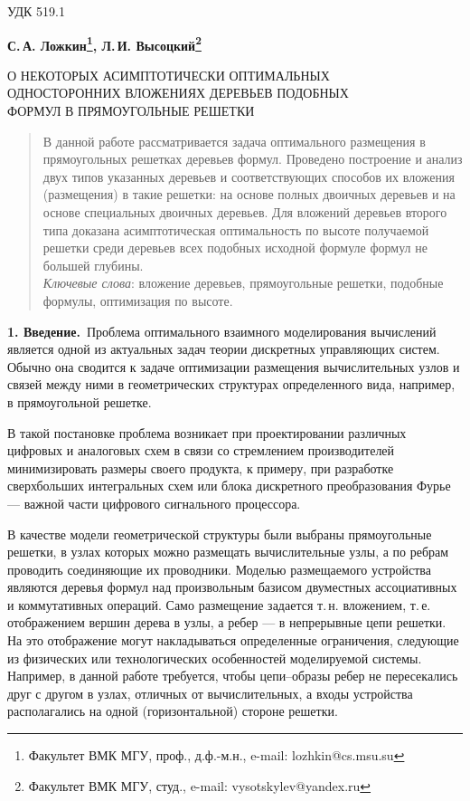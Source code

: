 \documentclass[12pt, a4paper]{article}
\theoremstyle{plain}
\theoremstyle{definition}
\theoremstyle{definition}
\begin{document}
\noindent УДК 519.1
\medskip

{\bfseries
С.\,А. Ложкин\footnote[1]{Факультет ВМК МГУ, проф., д.ф.-м.н.,
                       e-mail: lozhkin@cs.msu.su},
Л.\,И. Высоцкий\footnote[2]{Факультет ВМК МГУ, студ.,
                       e-mail: vysotskylev@yandex.ru}
\medskip

О НЕКОТОРЫХ АСИМПТОТИЧЕСКИ ОПТИМАЛЬНЫХ \\
\indent ОДНОСТОРОННИХ ВЛОЖЕНИЯХ  ДЕРЕВЬЕВ ПОДОБНЫХ \\
\indent ФОРМУЛ  В ПРЯМОУГОЛЬНЫЕ РЕШЕТКИ
}

\begin{quotation}{\footnotesize
В данной работе рассматривается задача оптимального размещения в прямоугольных 
решетках деревьев формул. Проведено построение 
и анализ двух типов указанных деревьев и соответствующих способов их вложения (размещения) в 
такие решетки: 
на основе полных двоичных деревьев и на основе специальных двоичных деревьев.
Для вложений деревьев второго типа доказана асимптотическая оптимальность по высоте получаемой решетки 
среди деревьев всех подобных исходной формуле формул не большей глубины.
  \\
 \indent\textit{Ключевые слова}: вложение деревьев, прямоугольные
  решетки, подобные формулы, оптимизация по высоте.}
\end{quotation}
\medskip

{\bfseries 1. Введение.}\ 
Проблема оптимального взаимного моделирования вычислений является 
одной из актуальных задач теории дискретных управляющих систем.
Обычно она сводится к задаче оптимизации размещения
вычислительных узлов и связей между ними в геометрических структурах определенного вида, например, в прямоугольной решетке.

В такой постановке проблема возникает при проектировании различных
цифровых и аналоговых схем в связи со стремлением производителей минимизировать размеры своего продукта, к примеру, при разработке сверхбольших интегральных схем или блока  дискретного преобразования Фурье --- важной части цифрового сигнального процессора.

В качестве модели геометрической структуры были выбраны прямоугольные решетки, в узлах которых можно
размещать вычислительные узлы, а по ребрам проводить соединяющие их проводники. 
Моделью размещаемого устройства являются деревья формул над произвольным базисом
двуместных ассоциативных и коммутативных операций. 
Само размещение задается т.\,н. вложением, т.\,е. отображением вершин дерева в узлы, а ребер ---
в непрерывные цепи решетки. На это отображение могут накладываться определенные ограничения,
следующие из физических или технологических особенностей моделируемой системы.
Например, в данной работе требуется, чтобы цепи--образы ребер не пересекались друг с другом
в узлах, отличных от вычислительных, а входы устройства располагались на одной 
(горизонтальной) стороне решетки.
\end{document}
